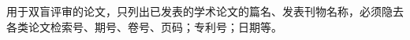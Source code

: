 \begin{achievelist}
 \item \cite{123ac} 
\end{achievelist}

\vspace{\baselineskip}
{\color{red} 用于双盲评审的论文，只列出已发表的学术论文的篇名、发表刊物名称，必须隐去各类论文检索号、期号、卷号、页码；专利号；日期等。}